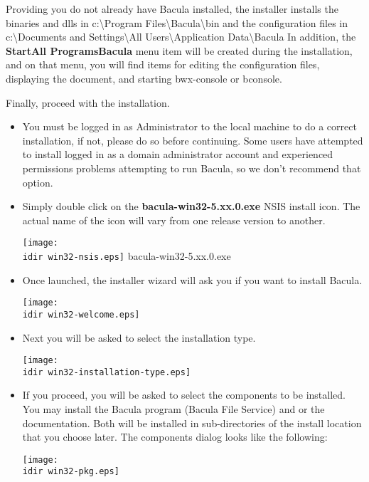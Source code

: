 Providing you do not already have Bacula installed,
the installer installs the binaries and dlls in 
c:\textbackslash{}Program Files\textbackslash{}Bacula\textbackslash{}bin  
and the configuration files
in c:\textbackslash{}Documents and Settings\textbackslash{}All Users\textbackslash{}Application Data\textbackslash{}Bacula
In addition, the {\bf Start\-\gt{}All Programs\-\gt{}Bacula} menu item
will be created during the installation, and on that menu, you
will find items for editing the configuration files, displaying
the document, and starting bwx-console or bconsole.


Finally, proceed with the installation. 

\begin{itemize}
\item You must be logged in as Administrator to the local machine
to do a correct installation, if not, please do so before continuing.
Some users have attempted to install logged in as a domain administrator
account and experienced permissions problems attempting to run
Bacula, so we don't recommend that option.
  
\item Simply double click on the {\bf bacula-win32-5.xx.0.exe}  NSIS install
   icon. The  actual name of the icon will vary from one release version to 
   another. 

\texttt{[image: \\idir win32-nsis.eps]}  bacula-win32-5.xx.0.exe  
  
\item Once launched, the installer wizard will ask you if you want  to install
   Bacula.  

\texttt{[image: \\idir win32-welcome.eps]}  

\item Next you will be asked to select the installation type. 

\texttt{[image: \\idir win32-installation-type.eps]}


\item If you proceed, you will be asked to select the components to be 
   installed. You may install the Bacula program (Bacula File Service)  and or
   the documentation. Both will be installed in sub-directories  of the install
   location that you choose later. The components  dialog looks like the
   following:  

\texttt{[image: \\idir win32-pkg.eps]}  


\end{itemize}
